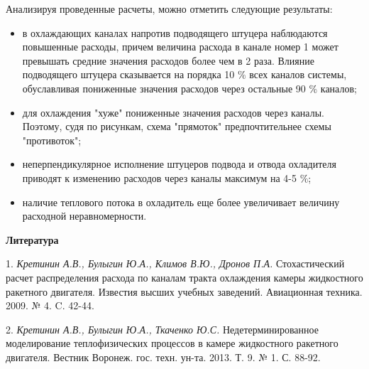 Анализируя проведенные расчеты, можно отметить следующие результаты:
\begin{itemize}
	\item
	в охлаждающих каналах напротив подводящего штуцера наблюдаются повышенные расходы, причем величина расхода в канале номер 1 может превышать средние значения расходов более чем в 2 раза. Влияние подводящего штуцера сказывается на порядка 10 $\%$ всех каналов системы, обуславливая пониженные значения расходов через остальные 90 $\%$ каналов;

	\item
	для охлаждения "хуже" пониженные значения расходов через каналы. Поэтому, судя по рисункам, схема "прямоток" предпочтительнее схемы "противоток";

	\item
	неперпендикулярное исполнение штуцеров подвода и отвода охладителя приводят к изменению расходов через каналы максимум на 4-5 $\%$;

	\item
	наличие теплового потока в охладитель еще более увеличивает величину расходной неравномерности.
\end{itemize}
\smallskip \centerline{\bf Литература}\nopagebreak

1. {\it Кретинин А.В., Булыгин Ю.А., Климов В.Ю., Дронов П.А.} Стохастический расчет распределения расхода по каналам тракта охлаждения камеры жидкостного ракетного двигателя. Известия высших учебных заведений. Авиационная техника. 2009. № 4. C. 42-44.

2. {\it Кретинин А.В., Булыгин Ю.А., Ткаченко Ю.С.} Недетерминированное моделирование теплофизических процессов в камере жидкостного ракетного двигателя. Вестник Воронеж. гос. техн. ун-та. 2013. Т. 9. № 1. С. 88-92.
